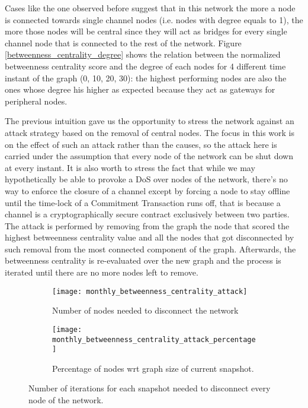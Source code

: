 	Cases like the one observed before suggest that in this network the more a node is connected towards single channel nodes (i.e. nodes with degree equals to 1), the more those nodes will be central since they will act as bridges for every single channel node that is connected to the rest of the network. Figure \ref{betweenness_centrality_degree} shows the relation between the normalized betweenness centrality score and the degree of each nodes for 4 different time instant of the graph (0, 10, 20, 30): the highest performing nodes are also the ones whose degree his higher as expected because they act as gateways for peripheral nodes. 
	
	The previous intuition gave us the opportunity to stress the network against an attack strategy based on the removal of central nodes. The focus in this work is on the effect of such an attack rather than the causes, so the attack here is carried under the assumption that every node of the network can be shut down at every instant. It is also worth to stress the fact that while we may hypothetically be able to provoke a DoS over nodes of the network, there's no way to enforce the closure of a channel except by forcing a node to stay offline until the time-lock of a Commitment Transaction runs off, that is because a channel is a cryptographically secure contract exclusively between two parties. The attack is performed by removing from the graph the node that scored the highest betweenness centrality value and all the nodes that got disconnected by such removal from the most connected component of the graph. Afterwards, the betweenness centrality is re-evaluated over the new graph and the process is iterated until there are no more nodes left to remove. 
	
	\begin{figure}[h]
		\centering
		\begin{subfigure}{0.45\textwidth}
			\centering
			\texttt{[image: monthly\_betweenness\_centrality\_attack]}
			\caption{Number of nodes needed to disconnect the network}
		\end{subfigure}
		\begin{subfigure}{0.45\textwidth}
			\centering
			\texttt{[image: monthly\_betweenness\_centrality\_attack\_percentage]}
			\caption{Percentage of nodes wrt graph size of current snapshot.}
		\end{subfigure}
		\caption{Number of iterations for each snapshot needed to disconnect every node of the network.}
		\label{betweenness_attack}
	\end{figure}
	
